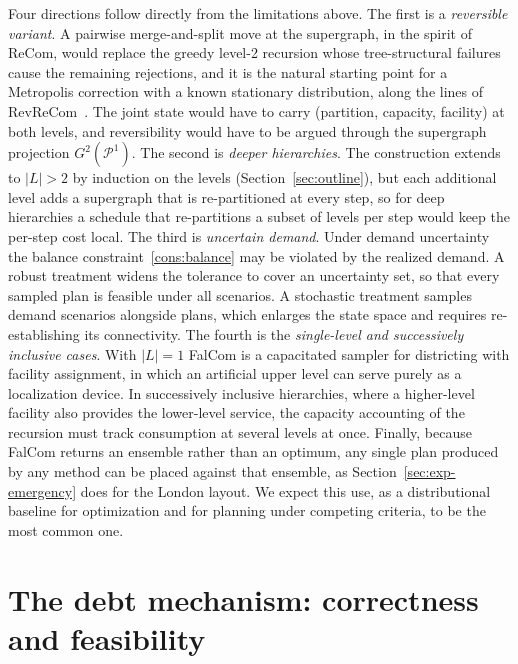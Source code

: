 \documentclass[11pt]{article}
\theoremstyle{definition}
\begin{document}
Four directions follow directly from the limitations above. The first is a
\emph{reversible variant}. A pairwise merge-and-split move at the supergraph,
in the spirit of ReCom, would replace the greedy level-2 recursion whose
tree-structural failures cause the remaining rejections, and it is the natural
starting point for a Metropolis correction with a known stationary
distribution, along the lines of RevReCom~\citep{cannon2026spanning}. The
joint state would have to carry (partition, capacity, facility) at both
levels, and reversibility would have to be argued through the supergraph
projection $G^2(\mathcal{P}^1)$. The
second is \emph{deeper hierarchies}. The construction extends to $|L| > 2$ by
induction on the levels (Section~\ref{sec:outline}), but each additional level
adds a supergraph that is re-partitioned at every step, so for deep
hierarchies a schedule that re-partitions a subset of levels per step would
keep the per-step cost local. The third is \emph{uncertain demand}. Under
demand uncertainty the balance constraint~\eqref{cons:balance} may be violated by the realized demand. A robust treatment widens the tolerance to cover an uncertainty set, so that every sampled plan is feasible under all scenarios. A stochastic treatment samples demand scenarios alongside plans, which enlarges the state space and requires re-establishing its connectivity. The
fourth is the \emph{single-level and successively inclusive cases}. With
$|L| = 1$ FalCom is a capacitated sampler for districting with facility
assignment, in which an artificial upper level can serve purely as a localization device. In successively inclusive hierarchies, where a higher-level facility also provides the lower-level service, the capacity accounting of the recursion must track consumption at several levels at once. Finally, because FalCom returns an ensemble rather than an optimum, any
single plan produced by any method can be placed against that ensemble, as Section~\ref{sec:exp-emergency} does for the London layout. We expect this use, as a distributional baseline for optimization and for planning under competing criteria, to be the most common one.

\medskip





\appendix\label{app}

\section{The debt mechanism: correctness and feasibility}
\label{app:debt}
\end{document}

